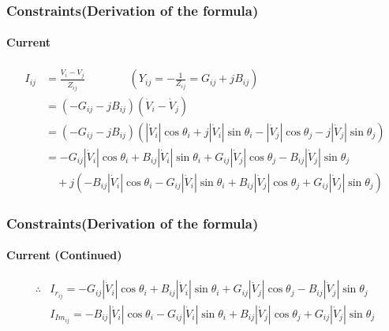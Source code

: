 \documentclass[
	11pt, %
	aspectratio=169, %
]{beamer}
\begin{document}
\begin{frame}
	\frametitle{Constraints(Derivation of the formula)}
	\framesubtitle{Current} %

	\begin{align*}
	 	I_{ij} &= \frac{\dot{V}_{i}-\dot{V}_{j}}{\dot{Z}_{ij}} \qquad \qquad \left(Y_{ij} =-\frac{1}{Z_{ij}} = G_{ij}+jB_{ij}\right)\\
		&=\left(-G_{ij}-jB_{ij}\right) \left(\dot{V}_{i}-\dot{V}_{j}\right) \\  
		&=\left(-G_{ij}-jB_{ij}\right) \left( \left\lvert \dot{V}_{i} \right\rvert \cos{\theta_{i}} + j\left\lvert \dot{V}_{i} \right\rvert \sin{\theta_{i}} - \left\lvert \dot{V}_{j} \right\rvert \cos{\theta_{j}} - j\left\lvert \dot{V}_{j} \right\rvert \sin{\theta_{j}}  \right) \\ 
		&= -G_{ij}\left\lvert \dot{V}_{i} \right\rvert \cos{\theta_{i}} + B_{ij}\left\lvert \dot{V}_{i} \right\rvert \sin{\theta_{i}} + G_{ij}\left\lvert \dot{V}_{j} \right\rvert \cos{\theta_{j}} - B_{ij}\left\lvert \dot{V}_{j} \right\rvert \sin{\theta_{j}}\\
		&\quad +j\left( -B_{ij}\left\lvert \dot{V}_{i} \right\rvert \cos{\theta_{i}} - G_{ij}\left\lvert \dot{V}_{i} \right\rvert \sin{\theta_{i}} + B_{ij}\left\lvert \dot{V}_{j} \right\rvert \cos{\theta_{j}} + G_{ij}\left\lvert \dot{V}_{j} \right\rvert \sin{\theta_{j}} \right) 
	\end{align*}

	
\end{frame}


\begin{frame}
	\frametitle{Constraints(Derivation of the formula)}
	\framesubtitle{Current (Continued)} %

	\begin{align*}
	 	\therefore &I_{r_{ij}} = -G_{ij}\left\lvert \dot{V}_{i} \right\rvert \cos{\theta_{i}} + B_{ij}\left\lvert \dot{V}_{i} \right\rvert \sin{\theta_{i}} + G_{ij}\left\lvert \dot{V}_{j} \right\rvert \cos{\theta_{j}} - B_{ij}\left\lvert \dot{V}_{j} \right\rvert \sin{\theta_{j}}\\
		 &I_{Im_{ij}} = -B_{ij}\left\lvert \dot{V}_{i} \right\rvert \cos{\theta_{i}} - G_{ij}\left\lvert \dot{V}_{i} \right\rvert \sin{\theta_{i}} + B_{ij}\left\lvert \dot{V}_{j} \right\rvert \cos{\theta_{j}} + G_{ij}\left\lvert \dot{V}_{j} \right\rvert \sin{\theta_{j}}
	\end{align*}

	
\end{frame}
\end{document}
